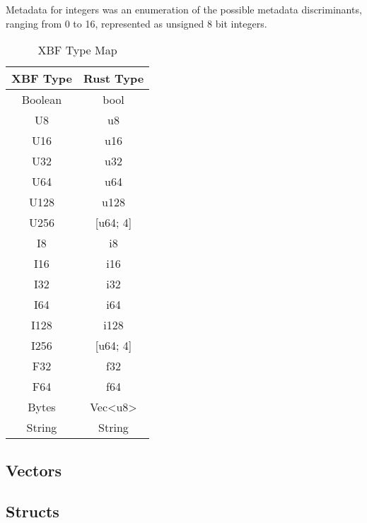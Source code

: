 \documentclass[conference]{IEEEtran}
\begin{document}
Metadata for integers was an enumeration of the possible metadata discriminants, ranging from 0 to 16, represented as unsigned 8 bit integers.

\begin{table}[htbp]
	\caption{XBF Type Map}\label{type_map}
	\begin{center}
		\begin{tabular}{|c|c|}
			\hline
			\textbf{XBF Type} & \textbf{Rust Type}          \\
			\hline
			Boolean           & bool                        \\
			U8                & u8                          \\
			U16               & u16                         \\
			U32               & u32                         \\
			U64               & u64                         \\
			U128              & u128                        \\
			U256              & [u64; 4]                    \\
			I8                & i8                          \\
			I16               & i16                         \\
			I32               & i32                         \\
			I64               & i64                         \\
			I128              & i128                        \\
			I256              & [u64; 4]                    \\
			F32               & f32                         \\
			F64               & f64                         \\
			Bytes             & Vec\textless u8\textgreater \\
			String            & String                      \\
			\hline
		\end{tabular}
	\end{center}
\end{table}

\subsection{Vectors}

\subsection{Structs}
\end{document}
